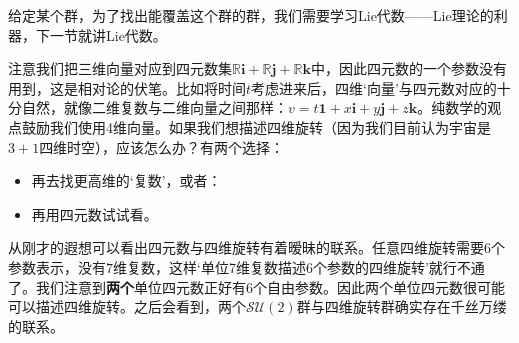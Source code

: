 给定某个群，为了找出能覆盖这个群的群，我们需要学习Lie代数——Lie理论的利器，下一节就讲Lie代数。

注意我们把三维向量对应到四元数集$\mathbb{R}\mathbf{i} + \mathbb{R}\mathbf{j} + \mathbb{R}\mathbf{k}$中，因此四元数的一个参数没有用到，这是相对论的伏笔。比如将时间$t$考虑进来后，四维‘向量’与四元数对应的十分自然，就像二维复数与二维向量之间那样：$v = t\mathbf{1} + x\mathbf{i} + y\mathbf{j} + z\mathbf{k}$。纯数学的观点鼓励我们使用4维向量。如果我们想描述四维旋转（因为我们目前认为宇宙是$3+1$四维时空），应该怎么办？有两个选择：
\begin{itemize}
	\item 再去找更高维的‘复数’，或者：
	\item 再用四元数试试看。
\end{itemize}
从刚才的遐想可以看出四元数与四维旋转有着暧昧的联系。任意四维旋转需要$6$个参数表示，没有$7$维复数，这样‘单位7维复数描述6个参数的四维旋转’就行不通了。我们注意到{\bfseries 两个}单位四元数正好有$6$个自由参数。因此两个单位四元数很可能可以描述四维旋转。之后会看到，两个$\mathcal{SU}(2)$群与四维旋转群确实存在千丝万缕的联系。

